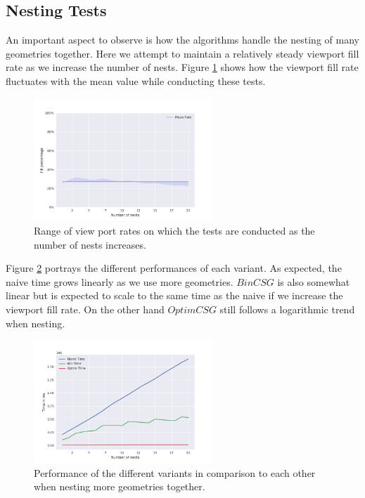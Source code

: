 \documentclass[a4paper,11pt,oneside]{article}
\begin{document}
\subsection{Nesting Tests}

An important aspect to observe is how the algorithms handle the nesting of many geometries together. Here we attempt to maintain a relatively steady viewport fill rate as we increase the number of nests. Figure \ref{sec5.2:test_nesting_rates} shows how the viewport fill rate fluctuates with the mean value while conducting these tests.

\begin{figure}[H]
	\centering
	\includegraphics[width=0.6\textwidth]{section5/plots/test_nesting_rates.png}
	\caption{Range of view port rates on which the tests are conducted as the number of nests increases.}
	\label{sec5.2:test_nesting_rates}
\end{figure}


Figure \ref{sec5.2:test_nesting} portrays the different performances of each variant. As expected, the naive time grows linearly as we use more geometries. $BinCSG$ is also somewhat linear but is expected to scale to the same time as the naive if we increase the viewport fill rate. On the other hand $OptimCSG$ still follows a logarithmic trend when nesting. 

\begin{figure}[H]
	\centering
	\includegraphics[width=0.6\textwidth]{section5/plots/test_nesting.png}
	\caption{Performance of the different variants in comparison to each other when nesting more geometries together.}
	\label{sec5.2:test_nesting}
\end{figure}
\end{document}
